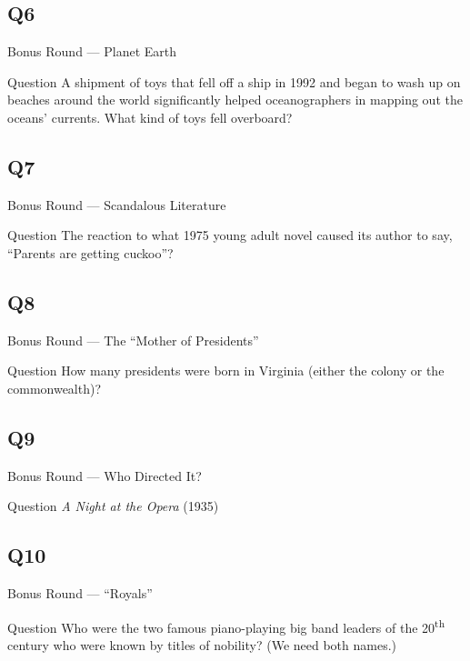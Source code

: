 \documentclass[11pt]{beamer}
\begin{document}
\subsection*{Q6}
\begin{frame}[t]{Bonus Round --- Planet Earth}
\vspace{-0.5em}
\begin{block}{Question}
A shipment of toys that fell off a ship in 1992 and began to wash up on beaches around the world significantly helped oceanographers in mapping out the oceans' currents. What kind of toys fell overboard?
\end{block}
\end{frame}
\subsection*{Q7}
\begin{frame}[t]{Bonus Round --- Scandalous Literature}
\vspace{-0.5em}
\begin{block}{Question}
The reaction to what 1975 young adult novel caused its author to say, ``Parents are getting cuckoo''?
\end{block}
\end{frame}
\subsection*{Q8}
\begin{frame}[t]{Bonus Round --- The ``Mother of Presidents''}
\vspace{-0.5em}
\begin{block}{Question}
How many presidents were born in Virginia (either the colony or the commonwealth)?
\end{block}
\end{frame}
\subsection*{Q9}
\begin{frame}[t]{Bonus Round --- Who Directed It?}
\vspace{-0.5em}
\begin{block}{Question}
\emph{A Night at the Opera} (1935)
\end{block}
\end{frame}
\subsection*{Q10}
\begin{frame}[t]{Bonus Round --- ``Royals''}
\vspace{-0.5em}
\begin{block}{Question}
Who were the two famous piano-playing big band leaders of the 20\textsuperscript{th} century who were known by titles of nobility? (We need both names.)
\end{block}
\end{frame}
\end{document}
